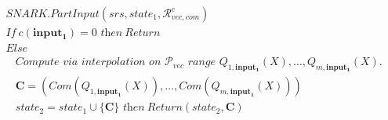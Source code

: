 \begin{align*} 
&\mathit{SNARK.PartInput}(\mathit{srs}, \mathit{state_1},\mathcal{R}_{\mathit{vec}, \mathit{com}}^c) \\  
& \mathit{If \ }  c(\mathbf{input_1}) = 0 \textit{ then} \ \mathit{Return} \\
& \mathit{Else} \\
& \ \ \ \ \textit{Compute via interpolation on } \mathscr{P}_{\mathit{vec}}  \textit{ range } 
\mathit{Q_{1,\mathbf{input_1}}}(X), \ldots, \mathit{Q_{m, \mathbf{input_1}}}(X).\\
& \ \ \ \ \mathbf{C} = (\mathit{Com}(Q_{1,\mathbf{input_1}}(X)), \ldots, \mathit{Com}(Q_{m,\mathbf{input_1}}(X))) \\
& \ \ \ \ \mathit{state_2} =  \mathit{state_1} \cup \{ \mathbf{C} \} \textit{ then} \ \mathit{Return} (\mathit{state_2,  \mathbf{C}})
\end{align*}

